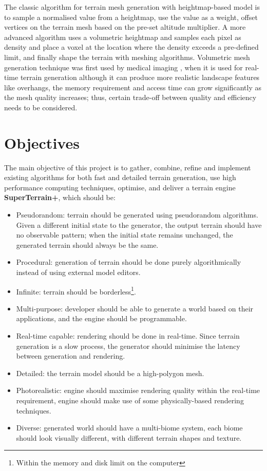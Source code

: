 \documentclass[oneside, a4paper]{article}
\begin{document}
    The classic algorithm for terrain mesh generation with heightmap-based model is to sample a normalised value from a heightmap, use the value as a weight, offset vertices on the terrain mesh based on the pre-set altitude multiplier. A more advanced algorithm \cite{gems3} uses a volumetric heightmap and samples each pixel as density and place a voxel at the location where the density exceeds a pre-defined limit, and finally shape the terrain with meshing algorithms. Volumetric mesh generation technique was first used by medical imaging \cite{marching_cubes}, when it is used for real-time terrain generation although it can produce more realistic landscape features like overhangs, the memory requirement and access time can grow significantly as the mesh quality increases; thus, certain trade-off between quality and efficiency needs to be considered.

    \section{Objectives}
    The main objective of this project is to gather, combine, refine and implement existing algorithms for both fast and detailed terrain generation, use high performance computing techniques, optimise, and deliver a terrain engine \textbf{SuperTerrain+}, which should be:
    \begin{itemize}[label=\(\diamond\)]
        \item Pseudorandom: terrain should be generated using pseudorandom algorithms. Given a different initial state to the generator, the output terrain should have no observable pattern; when the initial state remains unchanged, the generated terrain should always be the same.
        \item Procedural: generation of terrain should be done purely algorithmically instead of using external model editors.
        \item Infinite: terrain should be borderless\footnote{Within the memory and disk limit on the computer}.
        \item Multi-purpose: developer should be able to generate a world based on their applications, and the engine should be programmable.
        \item Real-time capable: rendering should be done in real-time. Since terrain generation is a slow process, the generator should minimise the latency between generation and rendering.
        \item Detailed: the terrain model should be a high-polygon mesh.
        \item Photorealistic: engine should maximise rendering quality within the real-time requirement, engine should make use of some physically-based rendering techniques.
        \item Diverse: generated world should have a multi-biome system, each biome should look visually different, with different terrain shapes and texture.
    \end{itemize}
\end{document}
